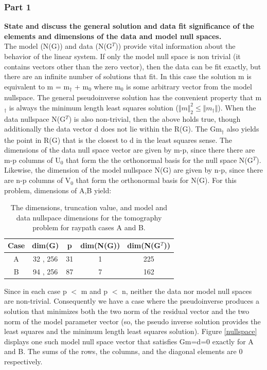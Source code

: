 \documentclass{article}
\begin{document}
\subsubsection*{Part 1} \textbf{State and discuss the general solution and data fit significance of the elements and dimensions of the data and model null spaces.} \\
The model (N(G)) and data (N(G$^T$)) provide vital information about the behavior of the linear system. If only the model null space is non trivial (it contains vectors other than the zero vector), then the data can be fit exactly, but there are an infinite number of solutions that fit. In this case the solution m is equivalent to m = m$_\dagger$ + m$_0$ where m$_0$ is some arbitrary vector from the model nullspace. The general pseudoinverse solution has the convenient property that m$_\dagger$ is always the minimum length least squares solution ($\Vert m \Vert_2^2 \leq \Vert m_\dagger \Vert$). 
When the data nullspace N(G$^T$) is also non-trivial, then the above holds true, though additionally the data vector d does not lie within the R(G). The Gm$_\dagger$ also yields the point in R(G) that is the closest to d in the least squares sense. 
The dimensions of the data null space vector are given by m-p, since there there are m-p columns of U$_0$ that form the the orthonormal basis for the null space N(G$^T$). Likewise, the dimension of the model nullspace N(G) are given by n-p, since there are n-p columns of V$_0$ that form the orthonormal basis for N(G). For this problem, dimensions of A,B yield:
\begin{table}[h!]
    \centering
    \begin{tabular}{|c|c|c|c|c|}
        \hline
         Case & dim(G) & p & dim(N(G)) & dim(N(G$^T$)) \\
        \hline
        A & 32 , 256 & 31 & 1 & 225 \\ 
        B & 94 , 256 & 87 & 7 & 162 \\ 
        \hline
    \end{tabular}
    \caption{The dimensions, truncation value, and model and data nullspace dimensions for the tomography problem for raypath cases A and B.}
    \label{tab:my_label}
\end{table}
Since in each case p $<$ m and p $<$ n, neither the data nor model null spaces are non-trivial. Consequently we have a case where the pseudoinverse produces a solution that minimizes both the two norm of the residual vector and the two norm of the model parameter vector (so, the pseudo inverse solution provides the least squares and the minimum length least squares solution).
Figure \ref{nullspace} displays one such model null space vector that satisfies Gm=d=0 exactly for A and B. The sums of the rows, the columns, and the diagonal elements are 0 respectively. 
\end{document}
